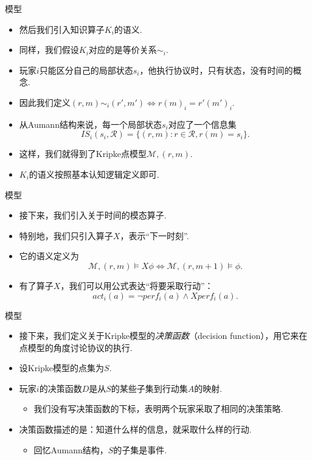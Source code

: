 \begin{frame}{模型}
\begin{itemize}
    \item 然后我们引入知识算子$K_i$的语义.
    \item 同样，我们假设$K_i$对应的是等价关系$\sim_i$.
    \item 玩家$i$只能区分自己的局部状态$s_i$，他执行协议时，只有状态，没有时间的概念.
    \item 因此我们定义$(r,m)\sim_i (r',m')\iff r(m)_i=r'(m')_i$.
    \item 从Aumann结构来说，每一个局部状态$s_i$对应了一个信息集
    \[IS_i(s_i,\mathcal R)=\{(r,m):r\in\mathcal R,r(m)=s_i\}.\]
    \item 这样，我们就得到了Kripke点模型$\mathcal M,(r,m)$.
    \item $K_i$的语义按照基本认知逻辑定义即可.
\end{itemize}
\end{frame}

\begin{frame}{模型}
\begin{itemize}
    \item 接下来，我们引入关于时间的模态算子.
    \item 特别地，我们只引入算子$X$，表示“下一时刻”.
    \item 它的语义定义为
    \[\mathcal M,(r,m)\vDash X\phi\iff\mathcal M,(r,m+1)\vDash\phi.\]
    \item 有了算子$X$，我们可以用公式表达“将要采取行动”：
    \[act_i(a)=\neg perf_i(a)\wedge X perf_i(a).\]
\end{itemize}
\end{frame}


\begin{frame}{模型}
\begin{itemize}
    \item 接下来，我们定义关于Kripke模型的\emph{决策函数}（decision function），用它来在点模型的角度讨论协议的执行.
    \item 设Kripke模型的点集为$S$.
    \item 玩家$i$的决策函数$D$是从$S$的某些子集到行动集$A$的映射.
    \begin{itemize}
        \item 我们没有写决策函数的下标，表明两个玩家采取了相同的决策策略.
    \end{itemize}
    \item 决策函数描述的是：知道什么样的信息，就采取什么样的行动.
    \begin{itemize}
        \item 回忆Aumann结构，$S$的子集是事件.
    \end{itemize}
\end{itemize}
\end{frame}

